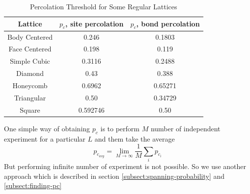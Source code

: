 	\begin{table}[h]
		\centering
		\begin{tabular}{|c|c|c|}
			\hline
			Lattice & $p_c$, site percolation & $p_c$, bond percolation \\ 		\hline
			Body Centered & 0.246 & 0.1803 \\ 		\hline
			Face Centered & 0.198 &  0.119 \\ 		\hline
			Simple Cubic & 0.3116 & 0.2488 \\ 		\hline
			Diamond & 0.43 & 0.388 \\ 		\hline
			Honeycomb & 0.6962 & 0.65271 \\ 		\hline
			Triangular & 0.50 & 0.34729 \\ 		\hline
			Square & 0.592746 & 0.50 \\ 		\hline
		\end{tabular}
		\caption{Percolation Threshold for Some Regular Lattices}
		\label{tab:percolation-threshold}
	\end{table}
	One simple way of obtaining $p_c$ is to perform $M$ number of independent experiment for a particular $L$ and them take the average 
	\begin{equation}
		p_{c_{avg}} = \lim_{M\rightarrow\infty}\frac{1}{M} \sum_{i} p_{c_i}
	\end{equation}
	But performing infinite number of experiment is not possible. So we use another approach which is described in section \ref{subsect:spanning-probability} and \ref{subsect:finding-pc}
	
	
	
